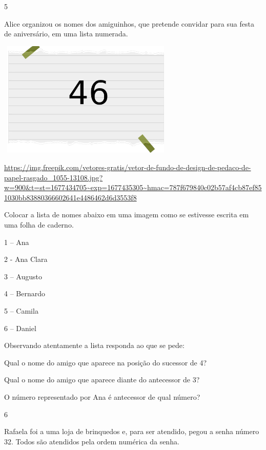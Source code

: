 \num{5}

Alice organizou os nomes dos amiguinhos, que pretende convidar para sua
festa de aniversário, em uma lista numerada.

\includegraphics[width=3.30833in,height=2.17391in]{media/image2.png}

\url{https://img.freepik.com/vetores-gratis/vetor-de-fundo-de-design-de-pedaco-de-papel-rasgado_1055-13108.jpg?w=900\&t=st=1677434705~exp=1677435305~hmac=787f679840c02b57af4cb87ef851030bb83880366602641e4486462d6d3553f8}

Colocar a lista de nomes abaixo em uma imagem como se estivesse escrita
em uma folha de caderno.

1 -- Ana

2 - Ana Clara

3 -- Augusto

4 -- Bernardo

5 -- Camila

6 -- Daniel

Observando atentamente a lista responda ao que se pede:

\begin{escolha}

\item
  Qual o nome do amigo que aparece na posição do sucessor de 4?

\item
  Qual o nome do amigo que aparece diante do antecessor de 3?

\item
  O número representado por Ana é antecessor de qual número?

\end{escolha}

\num{6}

Rafaela foi a uma loja de brinquedos e, para ser atendido, pegou a senha
número 32. Todos são atendidos pela ordem numérica da senha.

